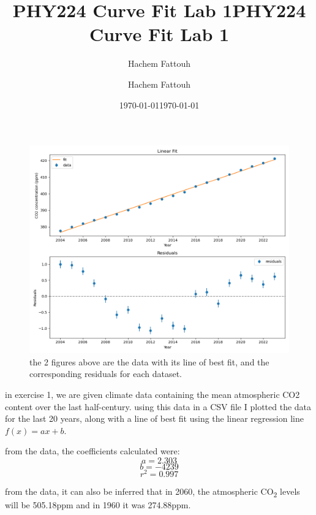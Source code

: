 \documentclass{article}
\title{PHY224 Curve Fit Lab 1}
\author{Hachem Fattouh}
\date{\today}
\title{PHY224 Curve Fit Lab 1}
\author{Hachem Fattouh}
\date{\today}
\begin{document}
\maketitle

\begin{figure}[h]
  \centering
  \includegraphics[width=\textwidth]{Exercise 1.png} 
  \caption{the 2 figures above are the data with its line of best fit,
  and the corresponding residuals for each dataset.}
  \label{fig:fit_and_residuals}
\end{figure}

in exercise 1, we are given climate data containing the mean atmospheric CO2 content over the last half-century. using this data in a CSV file I plotted the data
for the last 20 years, along with a line of best fit using the linear regression line \(f(x) = ax + b\).


from the data, the coefficients calculated were:
\[a = 2.303\]
\[b = -4239\]
\[r^2 = 0.997\]

from the data, it can also be inferred that in 2060, the atmospheric
CO\textsubscript{2} levels will be 505.18ppm and in 1960 it was
274.88ppm.
\end{document}
